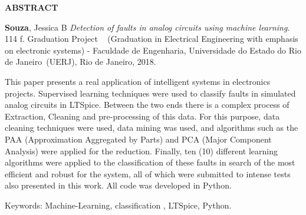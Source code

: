 \begin{center}
\textbf{ABSTRACT}
\end{center}

$\!$\\



\hspace {-1.3cm} \textbf {Souza}, Jessica B \textit{Detection of faults in analog circuits using machine learning}. 114 f. Graduation Project ~ (Graduation in Electrical Engineering with emphasis on electronic systems)  - Faculdade de Engenharia, Universidade do Estado do Rio de Janeiro~(UERJ), Rio de Janeiro, 2018.

This paper presents a real application of intelligent systems in electronics projects. Supervised learning techniques were used to classify faults in simulated analog circuits in LTSpice. Between the two ends there is a complex process of Extraction, Cleaning and pre-processing of this data. For this purpose, data cleaning techniques were used, data mining was used, and algorithms such as the PAA (Approximation Aggregated by Parts) and PCA (Major Component Analysis) were applied for the reduction. Finally, ten (10) different learning algorithms were applied to the classification of these faults in search of the most efficient and robust for the system, all of which were submitted to intense tests also presented in this work. All code was developed in Python.

\vspace{1cm}

\hspace{-1.3cm}Keywords: Machine-Learning, classification , LTSpice, Python.